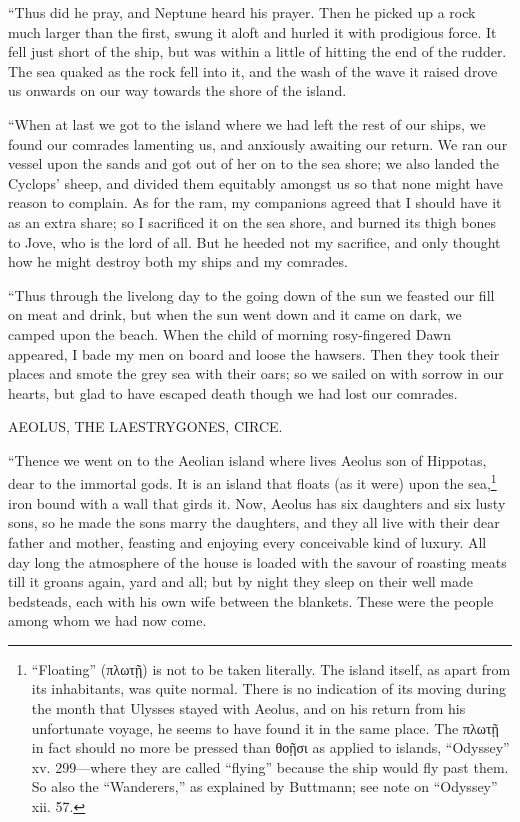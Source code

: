 “Thus did he pray, and Neptune heard his prayer. Then he picked up a rock much
larger than the first, swung it aloft and hurled it with prodigious force. It
fell just short of the ship, but was within a little of hitting the end of the
rudder. The sea quaked as the rock fell into it, and the wash of the wave it
raised drove us onwards on our way towards the shore of the island.

“When at last we got to the island where we had left the rest of our ships, we
found our comrades lamenting us, and anxiously awaiting our return. We ran our
vessel upon the sands and got out of her on to the sea shore; we also landed
the Cyclops’ sheep, and divided them equitably amongst us so that none might
have reason to complain. As for the ram, my companions agreed that I should
have it as an extra share; so I sacrificed it on the sea shore, and burned its
thigh bones to Jove, who is the lord of all. But he heeded not my sacrifice,
and only thought how he might destroy both my ships and my comrades.

“Thus through the livelong day to the going down of the sun we feasted our fill
on meat and drink, but when the sun went down and it came on dark, we camped
upon the beach. When the child of morning rosy-fingered Dawn appeared, I bade
my men on board and loose the hawsers. Then they took their places and smote
the grey sea with their oars; so we sailed on with sorrow in our hearts, but
glad to have escaped death though we had lost our comrades.


AEOLUS, THE LAESTRYGONES, CIRCE.

“Thence we went on to the Aeolian island where lives Aeolus son of Hippotas,
dear to the immortal gods. It is an island that floats (as it were) upon the
sea,\footnote{“Floating” (πλωτῇ) is not to be taken literally.
The island itself, as apart from its inhabitants, was quite normal. There is
no indication of its moving during the month that Ulysses stayed with Aeolus,
and on his return from his unfortunate voyage, he seems to have found it in
the same place. The πλωτῇ in fact should no more be
pressed than θοῇσι as applied to islands, “Odyssey”
xv. 299—where they are called “flying” because the ship would fly past them.
So also the “Wanderers,” as explained by Buttmann; see note on “Odyssey” xii.
57.} iron bound
with a wall that girds it. Now, Aeolus has six daughters and six lusty sons, so
he made the sons marry the daughters, and they all live with their dear father
and mother, feasting and enjoying every conceivable kind of luxury. All day
long the atmosphere of the house is loaded with the savour of roasting meats
till it groans again, yard and all; but by night they sleep on their well made
bedsteads, each with his own wife between the blankets. These were the people
among whom we had now come.

